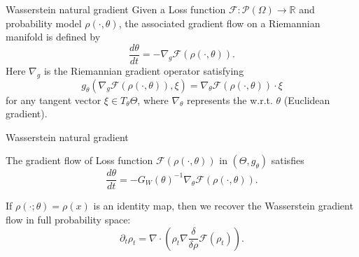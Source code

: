 \documentclass{beamer}
\begin{document}
\begin{frame}{Wasserstein natural gradient}
Given a Loss function $\mathcal{F}\colon \mathcal{P}(\Omega)\rightarrow \mathbb{R}$ and probability model $\rho(\cdot, \theta)$, the associated gradient flow on a Riemannian manifold is defined by 
\begin{equation*}
\frac{d\theta}{dt}=-\nabla_g\mathcal{F}(\rho(\cdot, \theta)).
\end{equation*}
Here $\nabla_g$ is the Riemannian gradient operator satisfying
\begin{equation*}
g_{\theta}(\nabla_g\mathcal{F}(\rho(\cdot, \theta)),\xi)=\nabla_\theta \mathcal{F}(\rho(\cdot, \theta))\cdot \xi
\end{equation*}
for any tangent vector $\xi\in T_\theta\Theta$, where $\nabla_\theta$ represents the w.r.t. $\theta$ (Euclidean gradient). 
\end{frame}
\begin{frame}{Wasserstein natural gradient}

\begin{block}

	The gradient flow of Loss function $\mathcal{F}(\rho(\cdot, \theta))$ in $(\Theta, g_{\theta})$ satisfies
	\begin{equation*}
	\label{eqn:gradient flow}
	\frac{d\theta}{dt}=-G_W(\theta)^{-1}\nabla_{\theta} \mathcal{F}(\rho(\cdot, \theta)).
	\end{equation*}
\end{block}

If $\rho(\cdot; \theta)=\rho(x)$ is an identity map, then we recover the Wasserstein gradient flow in full probability space:
\begin{equation*}
\partial_t\rho_t=\nabla\cdot(\rho_t\nabla \frac{\delta}{\delta\rho}\mathcal{F}(\rho_t)).
\end{equation*}
\end{frame}
\end{document}
